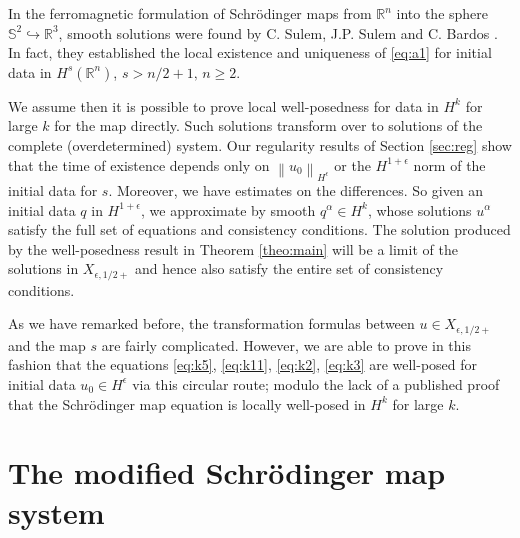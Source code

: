 \documentclass[draft,11pt,leqno]{amsart}
\newcommand{\norm}[2]{{\left\| #1 \right\|}_{#2}}
\newcommand{\al}{\alpha}
\newcommand{\rn}{{\mathbb R}^n}
\newcommand{\stwo}{\mathbb S^2}
\begin{document}
In the ferromagnetic formulation of Schr\"odinger maps from $\rn$ 
into the sphere $\stwo \hookrightarrow {\mathbb R}^3$, 
smooth solutions were found by  C. Sulem, J.P. Sulem 
and C. Bardos \cite{Sulem}. In fact, they established the local existence and uniqueness of \eqref{eq:a1} for initial data in $H^s(\rn)$, $s > n/2 + 1, \, n \ge 2 $.

We assume then it is possible to prove local well-posedness for data 
in $H^k$ for large $k$ for the map directly.
Such solutions transform over to 
solutions of the complete (overdetermined) system. Our regularity results of 
Section \ref{sec:reg} show that the time of existence depends only on 
$\norm{u_0}{H^{\epsilon}}$ or the $H^{1+\epsilon}$ norm of the initial 
data for $s$. Moreover, we have estimates on the differences. So given 
an initial data $q$ in $H^{1+\epsilon}$, we approximate by smooth  
$q^{\al} \in H^k$, whose solutions $u^\al$ satisfy the full set of equations 
and consistency conditions. The solution produced by the well-posedness
result in Theorem \ref{theo:main} will be a limit of the solutions in 
$X_{\epsilon, 1/2+}$ and hence also satisfy the entire set of 
consistency conditions. 

As we have remarked before, the transformation formulas between 
$u\in X_{\epsilon, 1/2+}$ and the map $s$ are fairly complicated. However, we are able
to prove in this fashion that the equations \eqref{eq:k5},  \eqref{eq:k11}, 
 \eqref{eq:k2},  \eqref{eq:k3} are well-posed for initial data 
$u_0\in H^\epsilon$ via this circular route; modulo the lack of a published
proof that the Schr\"odinger map equation is locally well-posed in $H^k$ 
for large $k$.

\vspace{.5cm}

\section{The modified Schr\"odinger map system}
\label{sec:2}
 
\vspace{.5cm}
\end{document}
